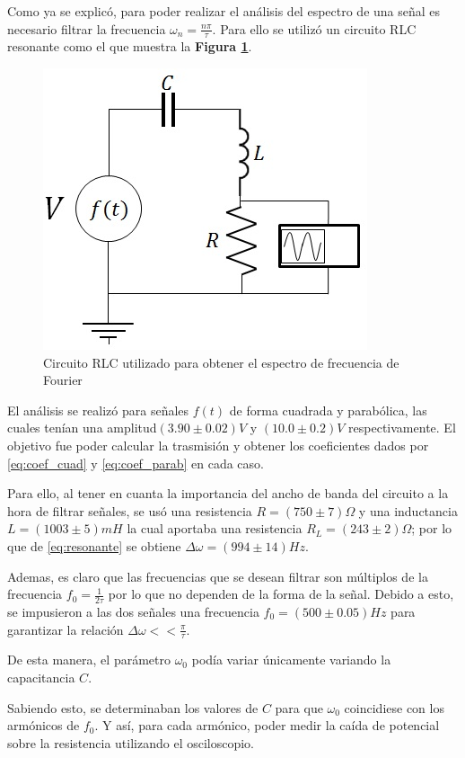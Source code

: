 \documentclass[11pt,a4paper]{article}
\begin{document}
Como ya se explicó, para poder realizar el análisis del espectro de una señal es necesario filtrar la frecuencia $\omega_n = \frac{n \pi}{\tau}$. Para ello se utilizó un circuito RLC resonante como el que muestra la \textbf{Figura \ref{fig:RLC-espectro}}.

\begin{figure}[h]
\centering
\includegraphics[scale=.7]{RLC-espectro}
\caption{Circuito RLC utilizado para obtener el espectro de frecuencia de Fourier}
\label{fig:RLC-espectro}
\end{figure}

El análisis se realizó para señales $f(t)$  de forma cuadrada y parabólica, las cuales tenían una amplitud$(3.90 \pm 0.02)V$ y $(10.0 \pm 0.2)V$ respectivamente. El objetivo fue poder calcular la trasmisión y obtener los coeficientes dados por \eqref{eq:coef_cuad} y \eqref{eq:coef_parab} en cada caso.

Para ello, al tener en cuanta la importancia del ancho de banda del circuito a la hora de filtrar señales, se usó una resistencia $R=(750 \pm 7)\Omega$ y una inductancia $L=(1003 \pm 5)mH$ la cual aportaba una resistencia $R_L = (243 \pm 2)\Omega$; por lo que de \eqref{eq:resonante} se obtiene $\Delta \omega = (994 \pm 14)Hz$.

Ademas, es claro que las frecuencias que se desean filtrar son múltiplos de la frecuencia $f_0 = \frac{1}{2\tau}$ por lo que no dependen de la forma de la señal. Debido a esto, se impusieron a las dos señales una frecuencia $f_0 = (500 \pm 0.05) Hz$ para garantizar la relación $\Delta\omega << \frac{\pi}{\tau}$.

De esta manera, el parámetro $\omega_0$ podía variar únicamente variando la capacitancia $C$.

Sabiendo esto, se determinaban los valores de $C$ para que $\omega_0$ coincidiese con los armónicos de $f_0$. Y así, para cada armónico, poder medir la caída de potencial sobre la resistencia utilizando el osciloscopio. 
\end{document}

